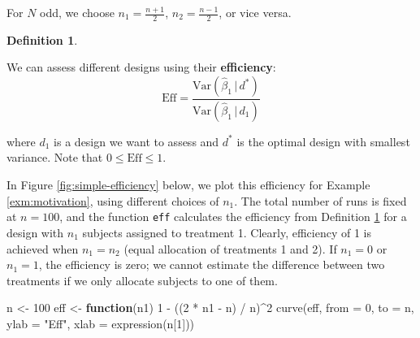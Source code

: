 \documentclass[
]{book}
\newenvironment{Shaded}{\begin{snugshade}}{\end{snugshade}}
\newcommand{\AttributeTok}[1]{\textcolor[rgb]{0.77,0.63,0.00}{#1}}
\newcommand{\ControlFlowTok}[1]{\textcolor[rgb]{0.13,0.29,0.53}{\textbf{#1}}}
\newcommand{\DecValTok}[1]{\textcolor[rgb]{0.00,0.00,0.81}{#1}}
\newcommand{\FunctionTok}[1]{\textcolor[rgb]{0.00,0.00,0.00}{#1}}
\newcommand{\NormalTok}[1]{#1}
\newcommand{\OtherTok}[1]{\textcolor[rgb]{0.56,0.35,0.01}{#1}}
\newcommand{\SpecialCharTok}[1]{\textcolor[rgb]{0.00,0.00,0.00}{#1}}
\newcommand{\StringTok}[1]{\textcolor[rgb]{0.31,0.60,0.02}{#1}}
\theoremstyle{definition}
\newtheorem{definition}{Definition}[chapter]
\theoremstyle{definition}
\theoremstyle{definition}
\theoremstyle{definition}
\theoremstyle{remark}
\begin{document}
For \(N\) odd, we choose \(n_{1}=\frac{n+1}{2}\), \(n_{2}=\frac{n-1}{2}\), or vice versa.

\begin{definition}
\protect\hypertarget{def:simple-efficiency}{}\label{def:simple-efficiency}

We can assess different designs using their \textbf{efficiency}:
\begin{equation}
\textrm{Eff}=\frac{\textrm{Var}(\hat{\beta}_{1}\, |\, d^{*})}{\textrm{Var}(\hat{\beta}_{1}\, |\, d_{1})}
\label{eq:simple-efficiency}
\end{equation}

where \(d_{1}\) is a design we want to assess and \(d^{*}\) is the optimal design with smallest variance. Note that \(0\leq\textrm{Eff}\leq 1\).

\end{definition}

In Figure \ref{fig:simple-efficiency} below, we plot this efficiency for Example \ref{exm:motivation}, using different choices of \(n_1\). The total number of runs is fixed at \(n = 100\), and the function \texttt{eff} calculates the efficiency from Definition \ref{def:simple-efficiency} for a design with \(n_1\) subjects assigned to treatment 1. Clearly, efficiency of 1 is achieved when \(n_1 = n_2\) (equal allocation of treatments 1 and 2). If \(n_1=0\) or \(n_1 = 1\), the efficiency is zero; we cannot estimate the difference between two treatments if we only allocate subjects to one of them.



\begin{Shaded}
\begin{Highlighting}[]
\NormalTok{n }\OtherTok{\textless{}{-}} \DecValTok{100} 
\NormalTok{eff }\OtherTok{\textless{}{-}} \ControlFlowTok{function}\NormalTok{(n1) }\DecValTok{1} \SpecialCharTok{{-}}\NormalTok{ ((}\DecValTok{2} \SpecialCharTok{*}\NormalTok{ n1 }\SpecialCharTok{{-}}\NormalTok{ n) }\SpecialCharTok{/}\NormalTok{ n)}\SpecialCharTok{\^{}}\DecValTok{2} 
\FunctionTok{curve}\NormalTok{(eff, }\AttributeTok{from =} \DecValTok{0}\NormalTok{, }\AttributeTok{to =}\NormalTok{ n, }\AttributeTok{ylab =} \StringTok{"Eff"}\NormalTok{, }\AttributeTok{xlab =} \FunctionTok{expression}\NormalTok{(n[}\DecValTok{1}\NormalTok{]))}
\end{Highlighting}
\end{Shaded}
\end{document}
